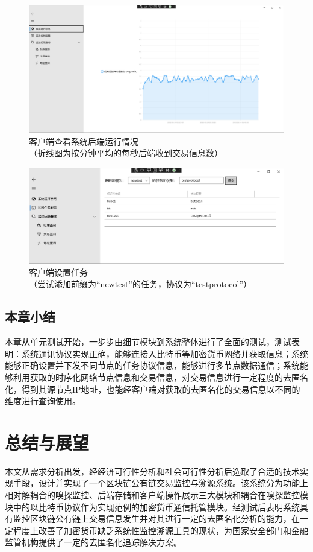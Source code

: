 \documentclass[supercite]{HustGraduPaper}
\newcommand{\xfig}[3]{
  \begin{figure}[htb]
    \centering
    #3
    \caption{#2}
    \label{fig:#1}
  \end{figure}
}
\theoremstyle{definition}
\begin{document}
\xfig{test:status}{客户端查看系统后端运行情况\\（折线图为按分钟平均的每秒后端收到交易信息数）}{
  \includegraphics[width=.9\textwidth]{images/5.4-status.png}
}

\xfig{test:config}{客户端设置任务\\（尝试添加前缀为“newtest”的任务，协议为“testprotocol”）}{
  \includegraphics[width=.9\textwidth]{images/5.4-config.png}
}



\subsection{本章小结}
本章从单元测试开始，一步步由细节模块到系统整体进行了全面的测试，测试表明：系统通讯协议实现正确，能够连接入比特币等加密货币网络并获取信息；系统能够正确设置并下发不同节点的任务协议信息，能够进行多节点数据通信；系统能够利用获取的时序化网络节点信息和交易信息，对交易信息进行一定程度的去匿名化，得到其源节点IP地址，也能经客户端对获取的去匿名化的交易信息以不同的维度进行查询使用。
\newpage
\section{总结与展望}
本文从需求分析出发，经经济可行性分析和社会可行性分析后选取了合适的技术实现手段，设计并实现了一个区块链公有链交易监控与溯源系统。该系统分为功能上相对解耦合的嗅探监控、后端存储和客户端操作展示三大模块和耦合在嗅探监控模块中的以比特币协议作为实现范例的加密货币通信托管模块。经测试后表明系统具有监控区块链公有链上交易信息发生并对其进行一定的去匿名化分析的能力，在一定程度上改善了加密货币缺乏系统性监控溯源工具的现状，为国家安全部门和金融监管机构提供了一定的去匿名化追踪解决方案。
\end{document}
